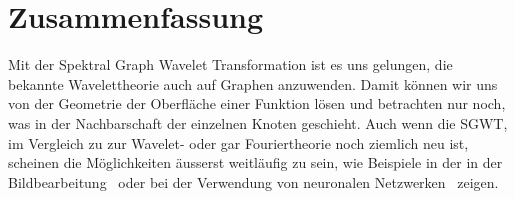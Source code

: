 
\section{Zusammenfassung\label{sec:sgwt:summary}}

Mit der Spektral Graph Wavelet Transformation ist es uns gelungen, die bekannte 
Wavelettheorie auch auf Graphen anzuwenden. Damit k\"onnen wir uns von der 
Geometrie der Oberfl\"ache einer Funktion l\"osen und betrachten nur noch, was 
in der Nachbarschaft der einzelnen Knoten geschieht. Auch wenn die SGWT, im 
Vergleich zu zur Wavelet- oder gar Fouriertheorie noch ziemlich neu ist, 
scheinen die M\"oglichkeiten \"ausserst weitl\"aufig zu sein, wie Beispiele in 
der in der Bildbearbeitung~\cite{shuman_emerging_2013} oder bei der Verwendung 
von neuronalen Netzwerken~\cite{xu_graph_2019} zeigen.

